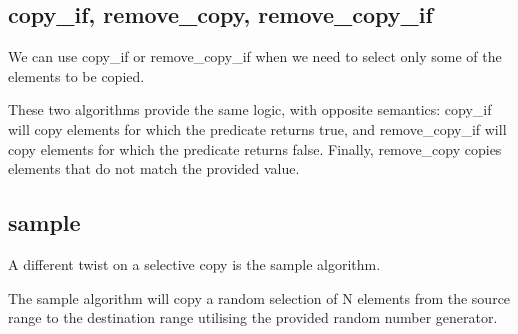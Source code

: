 \subsection{copy\_if, remove\_copy, remove\_copy\_if}

We can use copy\_if or remove\_copy\_if when we need to select only some of the elements to be copied.



These two algorithms provide the same logic, with opposite semantics: copy\_if will copy elements for which the predicate returns true, and remove\_copy\_if will copy elements for which the predicate returns false. Finally, remove\_copy copies elements that do not match the provided value.

\begin{box-note}
\end{box-note}

\subsection{sample}

A different twist on a selective copy is the sample algorithm.



The sample algorithm will copy a random selection of N elements from the source range to the destination range utilising the provided random number generator.

